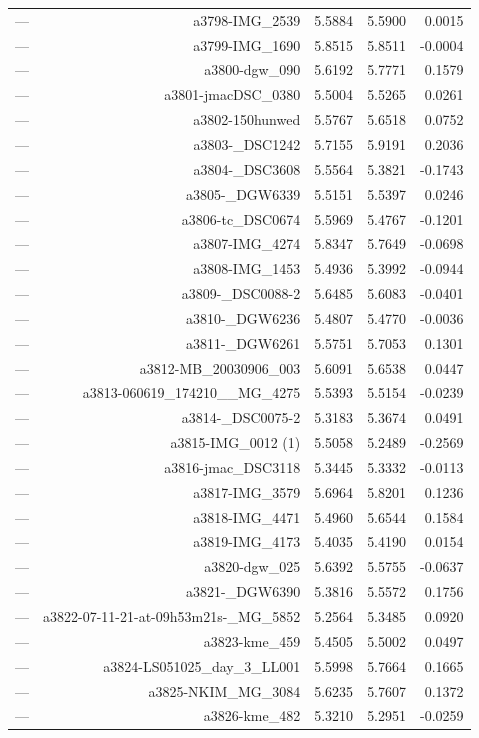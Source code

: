 \begin{table}[htbp]
\begin{tabular}{lrrrr}
— & a3798-IMG_2539 & 5.5884 & 5.5900 & 0.0015 \\
— & a3799-IMG_1690 & 5.8515 & 5.8511 & -0.0004 \\
— & a3800-dgw_090 & 5.6192 & 5.7771 & 0.1579 \\
— & a3801-jmacDSC_0380 & 5.5004 & 5.5265 & 0.0261 \\
— & a3802-150hunwed & 5.5767 & 5.6518 & 0.0752 \\
— & a3803-_DSC1242 & 5.7155 & 5.9191 & 0.2036 \\
— & a3804-_DSC3608 & 5.5564 & 5.3821 & -0.1743 \\
— & a3805-_DGW6339 & 5.5151 & 5.5397 & 0.0246 \\
— & a3806-tc_DSC0674 & 5.5969 & 5.4767 & -0.1201 \\
— & a3807-IMG_4274 & 5.8347 & 5.7649 & -0.0698 \\
— & a3808-IMG_1453 & 5.4936 & 5.3992 & -0.0944 \\
— & a3809-_DSC0088-2 & 5.6485 & 5.6083 & -0.0401 \\
— & a3810-_DGW6236 & 5.4807 & 5.4770 & -0.0036 \\
— & a3811-_DGW6261 & 5.5751 & 5.7053 & 0.1301 \\
— & a3812-MB_20030906_003 & 5.6091 & 5.6538 & 0.0447 \\
— & a3813-060619_174210__MG_4275 & 5.5393 & 5.5154 & -0.0239 \\
— & a3814-_DSC0075-2 & 5.3183 & 5.3674 & 0.0491 \\
— & a3815-IMG_0012 (1) & 5.5058 & 5.2489 & -0.2569 \\
— & a3816-jmac_DSC3118 & 5.3445 & 5.3332 & -0.0113 \\
— & a3817-IMG_3579 & 5.6964 & 5.8201 & 0.1236 \\
— & a3818-IMG_4471 & 5.4960 & 5.6544 & 0.1584 \\
— & a3819-IMG_4173 & 5.4035 & 5.4190 & 0.0154 \\
— & a3820-dgw_025 & 5.6392 & 5.5755 & -0.0637 \\
— & a3821-_DGW6390 & 5.3816 & 5.5572 & 0.1756 \\
— & a3822-07-11-21-at-09h53m21s-_MG_5852 & 5.2564 & 5.3485 & 0.0920 \\
— & a3823-kme_459 & 5.4505 & 5.5002 & 0.0497 \\
— & a3824-LS051025_day_3_LL001 & 5.5998 & 5.7664 & 0.1665 \\
— & a3825-NKIM_MG_3084 & 5.6235 & 5.7607 & 0.1372 \\
— & a3826-kme_482 & 5.3210 & 5.2951 & -0.0259 \\

\end{tabular}
\end{table}
